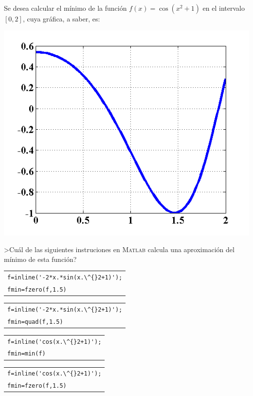 \begin{pregunta}
\begin{cuerpo}
 Se desea calcular el m\'inimo de la funci\'on $f(x)=\cos(x^2+1)$ en el intervalo $[0,2]$, cuya gr\'afica, a saber, es:
\medskip

\centerline{\includegraphics[width=.7\textwidth]{./img/prob01.png}}
\medskip

>Cu\'al de las siguientes instruciones en \textsc{Matlab} calcula una aproximaci\'on del m\'inimo de esta funci\'on?
\end{cuerpo}

\begin{multicols}{2}
\begin{alternativas}
{\begin{tabular}{|p{6cm}|} \hline \verb"f=inline('-2*x.*sin(x.\^{}2+1)');"\\ \verb"fmin=fzero(f,1.5)"\\ \hline \end{tabular}}
{\begin{tabular}{|p{6cm}|} \hline \verb"f=inline('-2*x.*sin(x.\^{}2+1)');"\\ \verb"fmin=quad(f,1.5)"\\ \hline \end{tabular}}
{\begin{tabular}{|p{6cm}|} \hline \verb"f=inline('cos(x.\^{}2+1)');"\\ \verb"fmin=min(f)"\\ \hline \end{tabular}}
{\begin{tabular}{|p{6cm}|} \hline \verb"f=inline('cos(x.\^{}2+1)');"\\ \verb"fmin=fzero(f,1.5)"\\ \hline \end{tabular}}
\end{alternativas}
\end{multicols}
\justificacion{0cm}
\end{pregunta}